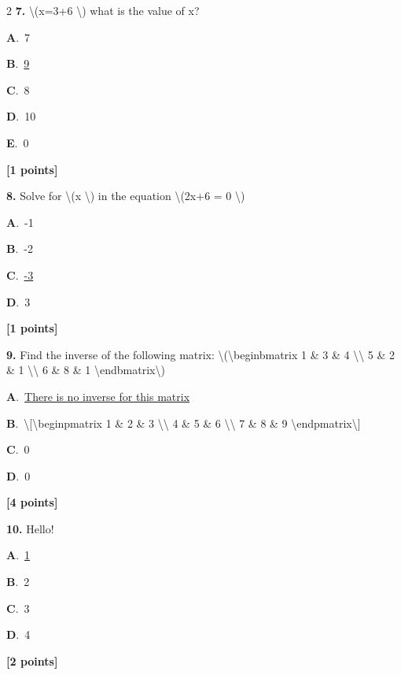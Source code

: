 \documentclass[12pt]{article}
\newcommand{\choice}[3]{%
  \noindent\textbf{#1}.~#2\hfill#3\par\vspace{0.25em}
}
\begin{document}
\begin{multicols}{2}
\noindent \textbf{\textenglish{7.}} {\textenglish{\textbackslash{}(x=3+6 \textbackslash{}) what is the value of x?}}

\noindent\choice{A}{{\textenglish{7}}}{}
\noindent\choice{B}{\underline{{\textenglish{9}}}}{}
\noindent\choice{C}{{\textenglish{8}}}{}
\noindent\choice{D}{{\textenglish{10}}}{}
\noindent\choice{E}{{\textenglish{0}}}{}
\hfill \textbf{[1 points]}\vspace{0.5em}

\noindent \textbf{\textenglish{8.}} {\textenglish{Solve for \textbackslash{}(x \textbackslash{}) in the equation \textbackslash{}(2x+6 = 0 \textbackslash{})}}

\noindent\choice{A}{{\textenglish{-1}}}{}
\noindent\choice{B}{{\textenglish{-2}}}{}
\noindent\choice{C}{\underline{{\textenglish{-3}}}}{}
\noindent\choice{D}{{\textenglish{3}}}{}
\hfill \textbf{[1 points]}\vspace{0.5em}

\noindent \textbf{\textenglish{9.}} {\textenglish{Find the inverse of the following matrix: \textbackslash{}(\textbackslash{}begin{bmatrix} 1 \& 3 \& 4 \textbackslash{}\textbackslash{} 5 \& 2 \& 1 \textbackslash{}\textbackslash{} 6 \& 8 \& 1 \textbackslash{}end{bmatrix}\textbackslash{})}}

\noindent\choice{A}{\underline{{\textenglish{There is no inverse for this matrix}}}}{}
\noindent\choice{B}{{\textenglish{\textbackslash{}[\textbackslash{}begin{pmatrix} 1 \& 2 \& 3 \textbackslash{}\textbackslash{} 4 \& 5 \& 6 \textbackslash{}\textbackslash{} 7 \& 8 \& 9  \textbackslash{}end{pmatrix}\textbackslash{}]}}}{}
\noindent\choice{C}{{\textenglish{0}}}{}
\noindent\choice{D}{{\textenglish{0}}}{}
\hfill \textbf{[4 points]}\vspace{0.5em}

\noindent \textbf{\textenglish{10.}} {\textenglish{Hello!}}

\noindent\choice{A}{\underline{{\textenglish{1}}}}{}
\noindent\choice{B}{{\textenglish{2}}}{}
\noindent\choice{C}{{\textenglish{3}}}{}
\noindent\choice{D}{{\textenglish{4}}}{}
\hfill \textbf{[2 points]}\vspace{0.5em}


\end{multicols}
\end{document}
